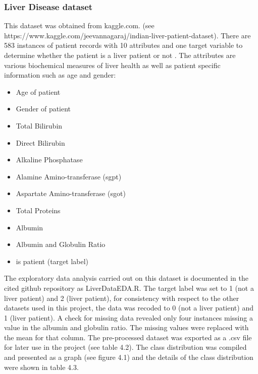 \subsubsection{Liver Disease dataset}
This dataset was obtained from kaggle.com.\newline
(see https://www.kaggle.com/jeevannagaraj/indian-liver-patient-dataset). \newline
There are 583 instances of patient records with 10 attributes and one target variable to determine whether the patient is a liver patient or not \citep{Ramana:2011tn}. The attributes are various biochemical measures of liver health as well as patient specific information such as age and gender:
\begin{itemize}
    \item Age of patient
    \item Gender of patient
    \item Total Bilirubin
    \item Direct Bilirubin
    \item Alkaline Phosphatase
    \item Alamine Amino-transferase (sgpt)
    \item Aspartate Amino-transferase (sgot)
    \item Total Proteins
    \item Albumin
    \item Albumin and Globulin Ratio
    \item is patient (target label)
\end{itemize}

The exploratory data analysis carried out on this dataset is documented in the cited github repository as LiverDataEDA.R.\newline
The target label was set to 1 (not a liver patient) and 2 (liver patient), for consistency with respect to the other datasets used in this project, the data was recoded to 0 (not a liver patient) and 1 (liver patient).\newline
A check for missing data revealed only four instances missing a value in the albumin and globulin ratio. The missing values were replaced with the mean for that column.\newline
The pre-processed dataset was exported as a .csv file for later use in the project (see table 4.2).\newline
The class distribution was compiled and presented as a graph (see figure 4.1) and the details of the class distribution were shown in table 4.3.\newline


